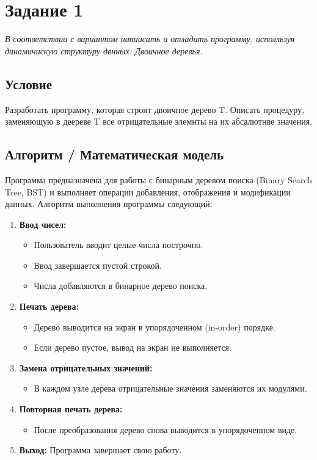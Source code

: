 \documentclass[a4paper,12pt]{article}
\begin{document}
\section*{Задание 1}
\textit{В соответствии с вариантом напиисать и отладить программу, исполльзуя
динамичискую структуру двнных: Двоичное деревья.}
\renewcommand{\thesubsection}{\arabic{subsection}} %
\setcounter{subsection}{0} %
\subsection{Условие}
Разработать программу, которая строит двоичное дерево T. Описать процедуру, заменяющую в деереве T все отрицательные элемнты
на их абсалютнве значения.
\subsection{Алгоритм / Математическая модель}

Программа предназначена для работы с бинарным деревом поиска (Binary Search Tree, BST) и выполняет операции добавления, отображения и модификации данных. Алгоритм выполнения программы следующий:

\begin{enumerate}
  \item \textbf{Ввод чисел:}
    \begin{itemize}
      \item Пользователь вводит целые числа построчно.
      \item Ввод завершается пустой строкой.
      \item Числа добавляются в бинарное дерево поиска.
    \end{itemize}

  \item \textbf{Печать дерева:}
    \begin{itemize}
      \item Дерево выводится на экран в упорядоченном (in-order) порядке.
      \item Если дерево пустое, вывод на экран не выполняется.
    \end{itemize}

  \item \textbf{Замена отрицательных значений:}
    \begin{itemize}
      \item В каждом узле дерева отрицательные значения заменяются их модулями.
    \end{itemize}

  \item \textbf{Повторная печать дерева:}
    \begin{itemize}
      \item После преобразования дерево снова выводится в упорядоченном виде.
    \end{itemize}

  \item \textbf{Выход:} Программа завершает свою работу.
\end{enumerate}
\end{document}
